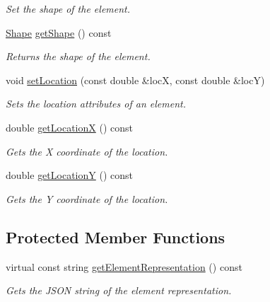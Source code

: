 \begin{DoxyCompactItemize}
\begin{DoxyCompactList}\small\item\em Set the shape of the element. \end{DoxyCompactList}\item 
\hyperlink{namespacebridges_1_1datastructure_a3408f5f44d9c6062e5f3adb7e1bbb7f0}{Shape} \hyperlink{classbridges_1_1datastructure_1_1_element_acb8680aa406733d36411fd189017706c}{get\+Shape} () const
\begin{DoxyCompactList}\small\item\em Returns the shape of the element. \end{DoxyCompactList}\item 
void \hyperlink{classbridges_1_1datastructure_1_1_element_af3af017c9d6efcbc2124d0231b57e7a6}{set\+Location} (const double \&locX, const double \&locY)
\begin{DoxyCompactList}\small\item\em Sets the location attributes of an element. \end{DoxyCompactList}\item 
double \hyperlink{classbridges_1_1datastructure_1_1_element_a471f2f69147deb0f514bb9720e0e18ea}{get\+LocationX} () const
\begin{DoxyCompactList}\small\item\em Gets the X coordinate of the location. \end{DoxyCompactList}\item 
double \hyperlink{classbridges_1_1datastructure_1_1_element_a6394039086bc1f27f2e6adf73294a74b}{get\+LocationY} () const
\begin{DoxyCompactList}\small\item\em Gets the Y coordinate of the location. \end{DoxyCompactList}\end{DoxyCompactItemize}
\subsection*{Protected Member Functions}
\begin{DoxyCompactItemize}
\item 
virtual const string \hyperlink{classbridges_1_1datastructure_1_1_element_a285fc51d6dfcb8bff2d72f7e4addfe6d}{get\+Element\+Representation} () const
\begin{DoxyCompactList}\small\item\em Gets the J\+S\+ON string of the element representation. \end{DoxyCompactList}\end{DoxyCompactItemize}
